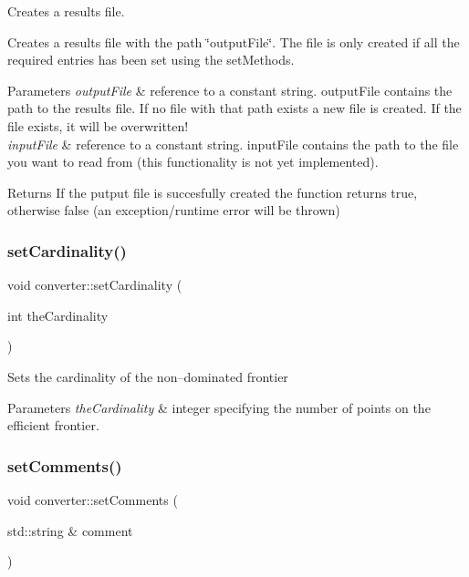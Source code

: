 Creates a results file. 

Creates a results file with the path \char`\"{}output\+File\char`\"{}. The file is only created if all the required entries has been set using the set\+Methods. 
\begin{DoxyParams}{Parameters}
{\em output\+File} & reference to a constant string. output\+File contains the path to the results file. If no file with that path exists a new file is created. If the file exists, it will be overwritten! \\
\hline
{\em input\+File} & reference to a constant string. input\+File contains the path to the file you want to read from (this functionality is not yet implemented). \\
\hline
\end{DoxyParams}
\begin{DoxyReturn}{Returns}
If the putput file is succesfully created the function returns true, otherwise false (an exception/runtime error will be thrown) 
\end{DoxyReturn}
\mbox{\label{classconverter_a8897d824355a5fc576c288689edfb97e}} 
\subsubsection{\texorpdfstring{set\+Cardinality()}{setCardinality()}}
{\footnotesize\ttfamily void converter\+::set\+Cardinality (\begin{DoxyParamCaption}\item[{int}]{the\+Cardinality }\end{DoxyParamCaption})\hspace{0.3cm}{\ttfamily [inline]}}

Sets the cardinality of the non--dominated frontier 
\begin{DoxyParams}{Parameters}
{\em the\+Cardinality} & integer specifying the number of points on the efficient frontier. \\
\hline
\end{DoxyParams}
\mbox{\label{classconverter_aebeb33eb063aaba00a0bedbbd29d97c6}} 
\subsubsection{\texorpdfstring{set\+Comments()}{setComments()}}
{\footnotesize\ttfamily void converter\+::set\+Comments (\begin{DoxyParamCaption}\item[{std\+::string \&}]{comment }\end{DoxyParamCaption})\hspace{0.3cm}{\ttfamily [inline]}}

